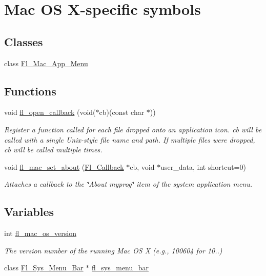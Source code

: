 \hypertarget{group__group__macosx}{}\section{Mac OS X-\/specific symbols}
\label{group__group__macosx}
\subsection*{Classes}
\begin{DoxyCompactItemize}
\item 
class \hyperlink{class_fl___mac___app___menu}{Fl\+\_\+\+Mac\+\_\+\+App\+\_\+\+Menu}
\end{DoxyCompactItemize}
\subsection*{Functions}
\begin{DoxyCompactItemize}
\item 
void \hyperlink{group__group__macosx_ga0702a54934d10f5b72157137cf291296}{fl\+\_\+open\+\_\+callback} (void($\ast$cb)(const char $\ast$))
\begin{DoxyCompactList}\small\item\em Register a function called for each file dropped onto an application icon. {\itshape cb} will be called with a single Unix-\/style file name and path. If multiple files were dropped, {\itshape cb} will be called multiple times. \end{DoxyCompactList}\item 
void \hyperlink{group__group__macosx_gac2ba4bfc66f7bc9792dffa2aeb53064e}{fl\+\_\+mac\+\_\+set\+\_\+about} (\hyperlink{_fl___widget_8_h_a640bea0193560eec20903c45c93c7472}{Fl\+\_\+\+Callback} $\ast$cb, void $\ast$user\+\_\+data, int shortcut=0)
\begin{DoxyCompactList}\small\item\em Attaches a callback to the \char`\"{}\+About myprog\char`\"{} item of the system application menu. \end{DoxyCompactList}\end{DoxyCompactItemize}
\subsection*{Variables}
\begin{DoxyCompactItemize}
\item 
int \hyperlink{group__group__macosx_ga2c7db6b2ea9a6ae37a26bea810d2056c}{fl\+\_\+mac\+\_\+os\+\_\+version}
\begin{DoxyCompactList}\small\item\em The version number of the running Mac OS X (e.\+g., 100604 for 10..) \end{DoxyCompactList}\item 
class \hyperlink{_fl___sys___menu___bar_8_h_a615bb5494aaeeb4298839e7a7cbcd09d}{Fl\+\_\+\+Sys\+\_\+\+Menu\+\_\+\+Bar} $\ast$ \hyperlink{group__group__macosx_gae169f554b5d3d2726f5e208df78e091b}{fl\+\_\+sys\+\_\+menu\+\_\+bar}
\end{DoxyCompactItemize}


